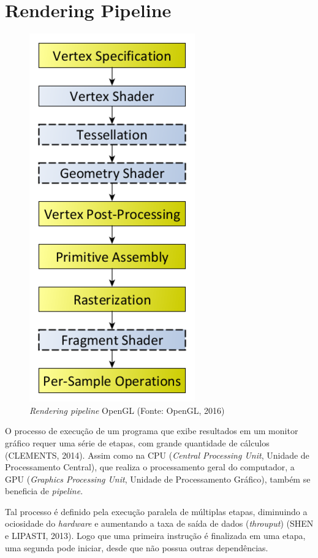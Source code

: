 \chapter{Rendering Pipeline}
\begin{figure}[h]
	\centering
	\includegraphics[scale=0.4]{imagens/openglPipeline.png}
	\caption{\small \textit{Rendering pipeline} OpenGL (Fonte: OpenGL, 2016)}
	\label{fig:glpipeline}
\end{figure}

O processo de execução de um programa que exibe resultados em um monitor gráfico requer uma série de etapas, com grande quantidade de cálculos (CLEMENTS, 2014). Assim como na CPU (\textit{Central Processing Unit}, Unidade de Processamento Central), que realiza o processamento geral do computador, a GPU (\textit{Graphics Processing Unit}, Unidade de Processamento Gráfico), também se beneficia de \textit{pipeline}.

Tal processo é definido pela execução paralela de múltiplas etapas, diminuindo a ociosidade do \textit{hardware} e aumentando a taxa de saída de dados (\textit{throuput}) (SHEN e LIPASTI, 2013). Logo que uma primeira instrução é finalizada em uma etapa, uma segunda pode iniciar, desde que não possua outras dependências.

